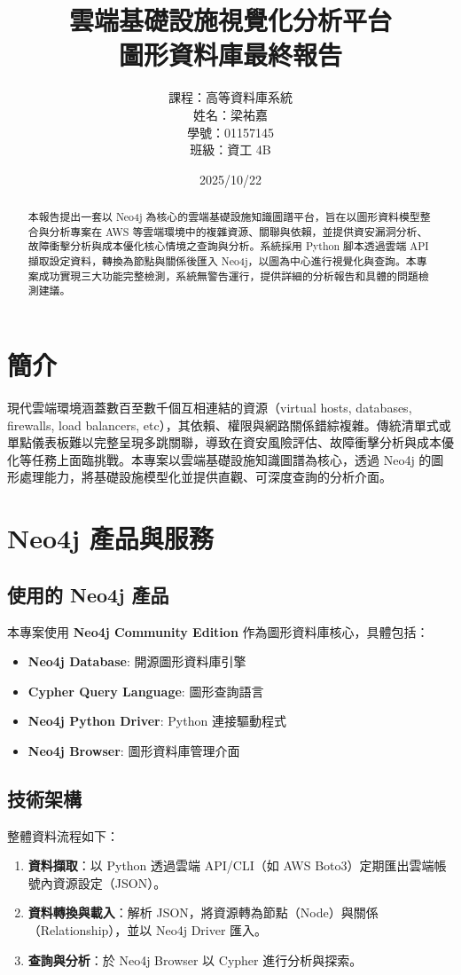 \documentclass[11pt,a4paper]{ctexart}
\title{雲端基礎設施視覺化分析平台\\圖形資料庫最終報告}
\author{課程：高等資料庫系統\\姓名：梁祐嘉\\學號：01157145\\班級：資工 4B}
\date{2025/10/22}
\begin{document}
\maketitle

\renewcommand{\abstractname}{\large 摘要}
\begin{abstract}
\normalsize
本報告提出一套以 Neo4j 為核心的雲端基礎設施知識圖譜平台，旨在以圖形資料模型整合與分析專案在 AWS 等雲端環境中的複雜資源、關聯與依賴，並提供資安漏洞分析、故障衝擊分析與成本優化核心情境之查詢與分析。系統採用 Python 腳本透過雲端 API 擷取設定資料，轉換為節點與關係後匯入 Neo4j，以圖為中心進行視覺化與查詢。本專案成功實現三大功能完整檢測，系統無警告運行，提供詳細的分析報告和具體的問題檢測建議。
\end{abstract}

\tableofcontents
\clearpage

\section{簡介}
現代雲端環境涵蓋數百至數千個互相連結的資源（virtual hosts, databases, firewalls, load balancers, etc），其依賴、權限與網路關係錯綜複雜。傳統清單式或單點儀表板難以完整呈現多跳關聯，導致在資安風險評估、故障衝擊分析與成本優化等任務上面臨挑戰。本專案以雲端基礎設施知識圖譜為核心，透過 Neo4j 的圖形處理能力，將基礎設施模型化並提供直觀、可深度查詢的分析介面。

\section{Neo4j 產品與服務}
\subsection{使用的 Neo4j 產品}
本專案使用 \textbf{Neo4j Community Edition} 作為圖形資料庫核心，具體包括：

\begin{itemize}[leftmargin=1.5em]
    \item \textbf{Neo4j Database}: 開源圖形資料庫引擎
    \item \textbf{Cypher Query Language}: 圖形查詢語言
    \item \textbf{Neo4j Python Driver}: Python 連接驅動程式
    \item \textbf{Neo4j Browser}: 圖形資料庫管理介面
\end{itemize}

\subsection{技術架構}
整體資料流程如下：
\begin{enumerate}[leftmargin=1.5em]
    \item \textbf{資料擷取}：以 Python 透過雲端 API/CLI（如 AWS Boto3）定期匯出雲端帳號內資源設定（JSON）。
    \item \textbf{資料轉換與載入}：解析 JSON，將資源轉為節點（Node）與關係（Relationship），並以 Neo4j Driver 匯入。
    \item \textbf{查詢與分析}：於 Neo4j Browser 以 Cypher 進行分析與探索。
\end{enumerate}
\end{document}
